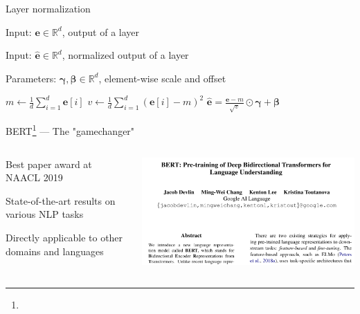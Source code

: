 \documentclass[12pt,aspectratio=169,handout]{beamer}
\begin{document}
\begin{frame}{Layer normalization}

Input: $\bm{e} \in \mathbb{R}^{d}$, output of a layer

Input: $\bm{\hat e} \in \mathbb{R}^{d}$, normalized output of a layer

Parameters: $\bm{\gamma}, \bm{\beta} \in \mathbb{R}^{d}$, element-wise scale and offset

\begin{algorithmic}[1]
\State $m \gets \frac{1}{d} \sum_{i = 1}^{d} \bm{e}[i]$
\State $v \gets \frac{1}{d} \sum_{i = 1}^{d} (\bm{e}[i] - m)^2$
\State \Return $\bm{\hat e} = \frac{\bm{e} - m}{\sqrt{v}} \odot \bm{\gamma} + \bm{\beta}$
\EndFunction
\end{algorithmic}	

\end{frame}





\begin{frame}{BERT\footnote{} --- The "gamechanger"}
	
	\begin{columns}
		\begin{column}{0.5\textwidth}
			Best paper award at NAACL 2019
			
			\bigskip
			
			State-of-the-art results on various NLP tasks
			
			\bigskip
			
			Directly applicable to other domains and languages
			
			
		\end{column}
		\begin{column}{0.5\textwidth}
			\includegraphics[width=\linewidth]{img/bert-paper01.png}
		\end{column}
	\end{columns}
	
\end{frame}
\end{document}
